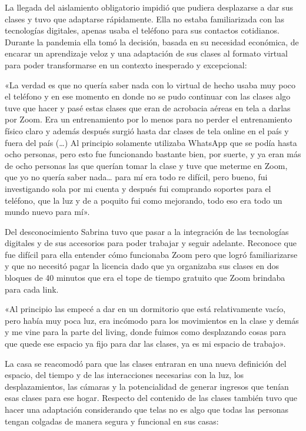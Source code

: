 \begin{refsection}
La llegada del aislamiento obligatorio impidió que pudiera desplazarse a dar sus clases y tuvo que adaptarse rápidamente. Ella no estaba familiarizada con las tecnologías digitales, apenas usaba el teléfono para sus contactos cotidianos. Durante la pandemia ella tomó la decisión, basada en su necesidad económica, de encarar un aprendizaje veloz y una adaptación de sus clases al formato virtual para poder transformarse en un contexto inesperado y excepcional:


\begin{gbcita}
«La verdad es que no quería saber nada con lo virtual de hecho usaba muy poco el teléfono y en ese momento en donde no se pudo continuar con las clases algo tuve que hacer y pasé estas clases que eran de acrobacia aéreas en tela a darlas por Zoom. Era un entrenamiento por lo menos para no perder el entrenamiento físico claro y además después surgió hasta dar clases de tela online en el país y fuera del país (…) Al principio solamente utilizaba WhatsApp que se podía hasta ocho personas, pero esto fue funcionando bastante bien, por suerte, y ya eran más de ocho personas las que querían tomar la clase y tuve que meterme en Zoom, que yo no quería saber nada… para mí era todo re difícil, pero bueno, fui investigando sola por mi cuenta y después fui comprando soportes para el teléfono, que la luz y de a poquito fui como mejorando, todo eso era todo un mundo nuevo para mí».

\end{gbcita}

Del desconocimiento Sabrina tuvo que pasar a la integración de las tecnologías digitales y de sus accesorios para poder trabajar y seguir adelante. Reconoce que fue difícil para ella entender cómo funcionaba Zoom pero que logró familiarizarse y que no necesitó pagar la licencia dado que ya organizaba sus clases en dos bloques de 40 minutos que era el tope de tiempo gratuito que Zoom brindaba para cada link.


\begin{gbcita}
«Al principio las empecé a dar en un dormitorio que está relativamente vacío, pero había muy poca luz, era incómodo para los movimientos en la clase y demás y me vine para la parte del living, donde fuimos como desplazando cosas para que quede ese espacio ya fijo para dar las clases, ya es mi espacio de trabajo».

\end{gbcita}

La casa se reacomodó para que las clases entraran en una nueva definición del espacio, del tiempo y de las interacciones necesarias con la luz, los desplazamientos, las cámaras y la potencialidad de generar ingresos que tenían esas clases para ese hogar. Respecto del contenido de las clases también tuvo que hacer una adaptación considerando que telas no es algo que todas las personas tengan colgadas de manera segura y funcional en sus casas:



\end{refsection}
